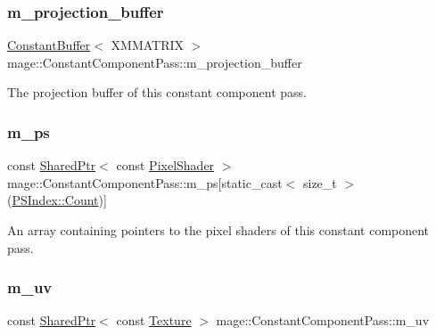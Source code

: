 \subsubsection{\texorpdfstring{m\+\_\+projection\+\_\+buffer}{m\_projection\_buffer}}
{\footnotesize\ttfamily \hyperlink{structmage_1_1_constant_buffer}{Constant\+Buffer}$<$ X\+M\+M\+A\+T\+R\+IX $>$ mage\+::\+Constant\+Component\+Pass\+::m\+\_\+projection\+\_\+buffer\hspace{0.3cm}{\ttfamily [private]}}

The projection buffer of this constant component pass. \hypertarget{classmage_1_1_constant_component_pass_a932366be8feba629aa2dd29a844e38b8}{}\label{classmage_1_1_constant_component_pass_a932366be8feba629aa2dd29a844e38b8} 
\subsubsection{\texorpdfstring{m\+\_\+ps}{m\_ps}}
{\footnotesize\ttfamily const \hyperlink{namespacemage_a1e01ae66713838a7a67d30e44c67703e}{Shared\+Ptr}$<$ const \hyperlink{namespacemage_a27ecaf266420ee7a494d64edc0757129}{Pixel\+Shader} $>$ mage\+::\+Constant\+Component\+Pass\+::m\+\_\+ps\mbox{[}static\+\_\+cast$<$ size\+\_\+t $>$(\hyperlink{classmage_1_1_constant_component_pass_a5700234587f2aa0ebdb4f7790704f00bae93f994f01c537c4e2f7d8528c3eb5e9}{P\+S\+Index\+::\+Count})\mbox{]}\hspace{0.3cm}{\ttfamily [private]}}

An array containing pointers to the pixel shaders of this constant component pass. \hypertarget{classmage_1_1_constant_component_pass_ad69f0d02de95b9125651b447cd8fd884}{}\label{classmage_1_1_constant_component_pass_ad69f0d02de95b9125651b447cd8fd884} 
\subsubsection{\texorpdfstring{m\+\_\+uv}{m\_uv}}
{\footnotesize\ttfamily const \hyperlink{namespacemage_a1e01ae66713838a7a67d30e44c67703e}{Shared\+Ptr}$<$ const \hyperlink{classmage_1_1_texture}{Texture} $>$ mage\+::\+Constant\+Component\+Pass\+::m\+\_\+uv\hspace{0.3cm}{\ttfamily [private]}}

